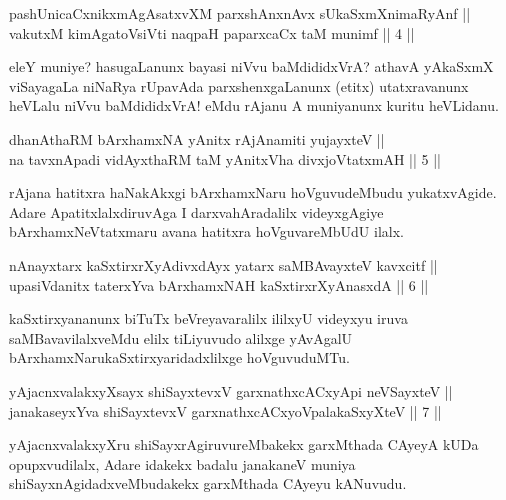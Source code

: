 \begin{shl}
pashUnicaCxnikxmAgAsatxvXM parxshAnxnAvx sUkaSxmXnimaRyAnf || \\
vakutxM kimAgatoV\s siVti naqpaH paparxcaCx taM munimf \hfill ||  4 ||  
\end{shl}

\begin{artha}
eleY muniye? hasugaLanunx bayasi niVvu baMdididxVrA? athavA yAkaSxmX viSayagaLa niNaRya rUpavAda parxshenxgaLanunx (etitx) utatxravanunx heVLalu niVvu baMdididxVrA! eMdu rAjanu A muniyanunx kuritu heVLidanu.
\end{artha}


\begin{shl}
dhanAthaRM bArxhamxNA yAnitx rAjAnamiti yujayxteV || \\
na tavxnApadi vidAyxthaRM taM yAnitxVha divxjoVtatxmAH \hfill ||  5 ||  
\end{shl}

\begin{artha}
rAjana hatitxra haNakAkxgi bArxhamxNaru hoVguvudeMbudu yukatxvAgide. Adare ApatitxlalxdiruvAga I darxvahAradalilx videyxgAgiye bArxhamxNeVtatxmaru avana hatitxra hoVguvareMbUdU ilalx.
\end{artha}

\begin{shl}
nAnayxtarx kaSxtirxrXyAdivxdAyx yatarx saMBAvayxteV kavxcitf || \\
upasiVdanitx taterxYva bArxhamxNAH kaSxtirxrXyAnasxdA \hfill ||  6 ||  
\end{shl}

\begin{artha}
kaSxtirxyananunx biTuTx beVreyavaralilx ililxyU videyxyu iruva saMBavavilalxveMdu elilx tiLiyuvudo alilxge yAvAgalU bArxhamxNarukaSxtirxyaridadxlilxge hoVguvuduMTu.
\end{artha}


\begin{shl}
yAjacnxvalakxyXsayx shiSayxtevxV garxnathxcACxyA\s pi neVSayxteV || \\
janakaseyxYva shiSayxtevxV garxnathxcACxyoVpalakaSxyXteV \hfill ||  7 ||  
\end{shl}

\begin{artha}
yAjacnxvalakxyXru shiSayxrAgiruvureMbakekx garxMthada CAyeyA kUDa opupxvudilalx, Adare idakekx badalu janakaneV muniya shiSayxnAgidadxveMbudakekx garxMthada CAyeyu kANuvudu.
\end{artha}

